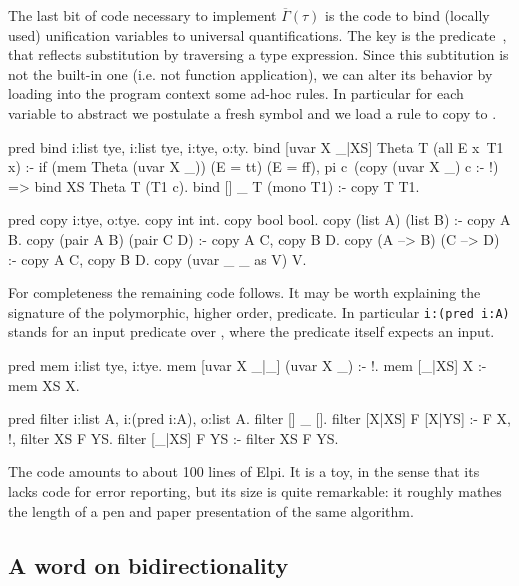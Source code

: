 \documentclass[a4paper, 11pt]{book}
\begin{document}
The last bit of code necessary to implement $\overline{\Gamma}(\tau)$ is
the code to bind (locally used) unification variables to universal quantifications.
The key is the  predicate~\cite{}, that reflects substitution
by traversing a type expression. Since this subtitution is not the built-in
one (i.e. not function application), we can alter its behavior by loading
into the program context some ad-hoc rules. In particular for
each variable  to abstract we postulate a fresh symbol
 and we load a rule to copy  to .

\begin{elpicode}
pred bind i:list tye, i:list tye, i:tye, o:ty.
bind [uvar X _|XS] Theta T (all E x\ T1 x) :- %
  if (mem Theta (uvar X _)) (E = tt) (E = ff),
  pi c\ (copy (uvar X _) c :- !) => bind XS Theta T (T1 c).
bind [] _ T (mono T1) :- copy T T1. %

pred copy i:tye, o:tye.
copy int int.
copy bool bool.
copy (list A) (list B) :- copy A B.
copy (pair A B) (pair C D) :- copy A C, copy B D.
copy (A --> B) (C --> D) :- copy A C, copy B D.
copy (uvar _ _ as V) V.
\end{elpicode}

For completeness the remaining code follows. It may be worth explaining the
signature of the polymorphic, higher order,  predicate.
In particular \texttt{i:(pred i:A)} stands for an input predicate over
, where the predicate itself expects an input.

\begin{elpicode}
pred mem i:list tye, i:tye.
mem [uvar X _|_] (uvar X _) :- !.
mem [_|XS] X :- mem XS X.
 
pred filter i:list A, i:(pred i:A), o:list A.
filter [] _ [].
filter [X|XS] F [X|YS] :- F X, !, filter XS F YS.
filter [_|XS] F YS :- filter XS F YS.
\end{elpicode}

The code amounts to about 100 lines of Elpi. It is a toy, in the sense
that its lacks code for error reporting, but its size is quite remarkable:
it roughly mathes the length of a pen and paper presentation of the same
algorithm.

\subsection{A word on bidirectionality}
\end{document}
